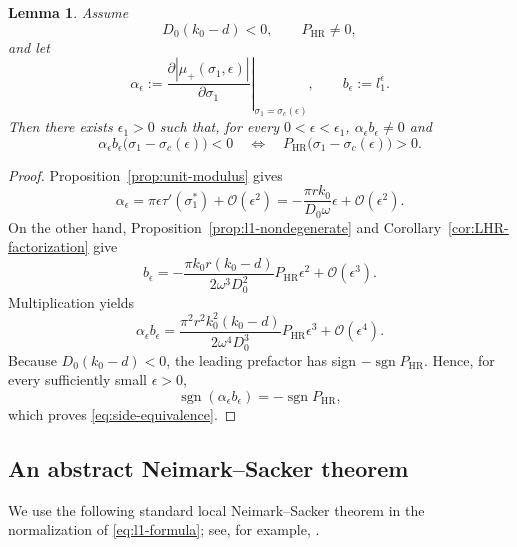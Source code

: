 \documentclass[11pt]{amsart}
\newtheorem{lemma}[theorem]{Lemma}
\theoremstyle{remark}
\newcommand{\cO}{\mathcal{O}}
\newcommand{\PHR}{P_{\mathrm{HR}}}
\begin{document}
\begin{lemma}\label{lem:side}
Assume
\[
 D_0(k_0-d)<0,\qquad \PHR\ne0,
\]
and let
\[
 \alpha_\epsilon:=
 \left.
 \frac{\partial|\mu_+(\sigma_1,\epsilon)|}{\partial\sigma_1}
 \right|_{\sigma_1=\sigma_c(\epsilon)},
 \qquad
 b_\epsilon:=l_1^\epsilon.
\]
Then there exists \(\epsilon_1>0\) such that, for every
\(0<\epsilon<\epsilon_1\), \(\alpha_\epsilon b_\epsilon\ne0\) and
\begin{equation}\label{eq:side-equivalence}
\alpha_\epsilon b_\epsilon
\bigl(\sigma_1-\sigma_c(\epsilon)\bigr)<0
\quad\Longleftrightarrow\quad
\PHR\bigl(\sigma_1-\sigma_c(\epsilon)\bigr)>0.
\end{equation}
\end{lemma}

\begin{proof}
Proposition~\ref{prop:unit-modulus} gives
\[
 \alpha_\epsilon
=\pi\epsilon\tau'(\sigma_1^*)+\cO(\epsilon^2)
=-\frac{\pi rk_0}{D_0\omega}\epsilon+\cO(\epsilon^2).
\]
On the other hand, Proposition~\ref{prop:l1-nondegenerate} and
Corollary~\ref{cor:LHR-factorization} give
\[
 b_\epsilon
=-\frac{\pi k_0r(k_0-d)}{2\omega^3D_0^2}\PHR\epsilon^2
+\cO(\epsilon^3).
\]
Multiplication yields
\[
 \alpha_\epsilon b_\epsilon
=\frac{\pi^2r^2k_0^2(k_0-d)}{2\omega^4D_0^3}
\PHR\epsilon^3+\cO(\epsilon^4).
\]
Because \(D_0(k_0-d)<0\), the leading prefactor has sign
\(-\operatorname{sgn}\PHR\).  Hence, for every sufficiently small
\(\epsilon>0\),
\[
 \operatorname{sgn}(\alpha_\epsilon b_\epsilon)
=-\operatorname{sgn}\PHR,
\]
which proves \eqref{eq:side-equivalence}.
\end{proof}

\subsection{An abstract Neimark--Sacker theorem}

We use the following standard local Neimark--Sacker theorem in the
normalization of \eqref{eq:l1-formula}; see, for example,
\cite[Chapter~4]{Kuznetsov2004}.
\end{document}
